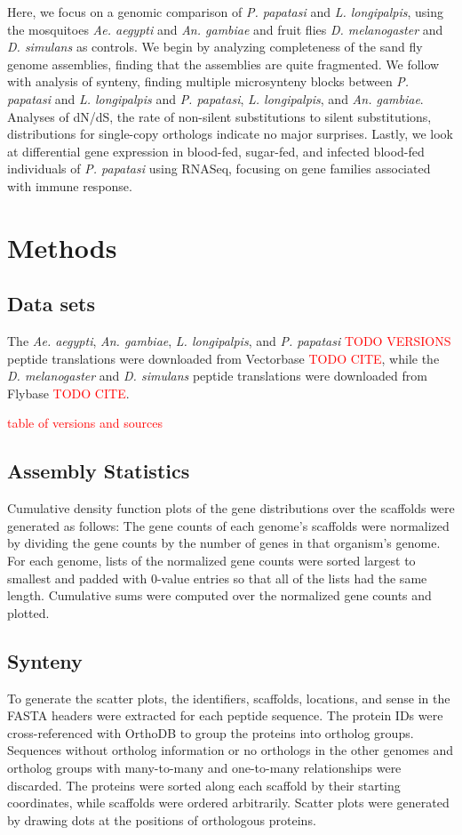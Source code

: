 Here, we focus on a genomic comparison of \emph{P. papatasi} and \emph{L. longipalpis}, using the mosquitoes \emph{Ae. aegypti} and \emph{An. gambiae} and fruit flies \emph{D. melanogaster} and \emph{D. simulans} as controls.  We begin by analyzing completeness of the sand fly genome assemblies, finding that the assemblies are quite fragmented.  We follow with analysis of synteny, finding multiple microsynteny blocks between \emph{P. papatasi} and \emph{L. longipalpis} and \emph{P. papatasi}, \emph{L. longipalpis}, and \emph{An. gambiae}. Analyses of dN/dS, the rate of non-silent substitutions to silent substitutions, distributions for single-copy orthologs indicate no major surprises.  Lastly, we look at differential gene expression in blood-fed, sugar-fed, and infected blood-fed individuals of \emph{P. papatasi} using RNASeq, focusing on gene families associated with immune response.

\section{Methods}

\subsection{Data sets}
The \emph{Ae. aegypti}, \emph{An. gambiae}, \emph{L. longipalpis}, and \emph{P. papatasi} \textcolor{red}{TODO VERSIONS} peptide translations were downloaded from Vectorbase \textcolor{red}{TODO CITE}, while the \emph{D. melanogaster} and \emph{D. simulans} peptide translations were downloaded from Flybase \textcolor{red}{TODO CITE}.

\textcolor{red}{table of versions and sources}

\subsection{Assembly Statistics}
Cumulative density function plots of the gene distributions over the scaffolds were generated as follows: The gene counts of each genome's scaffolds were normalized by dividing the gene counts by the number of genes in that organism's genome. For each genome, lists of the normalized gene counts were sorted largest to smallest and padded with 0-value entries so that all of the lists had the same length.  Cumulative sums were computed over the normalized gene counts and plotted.


\subsection{Synteny}
To generate the scatter plots, the identifiers, scaffolds, locations, and sense in the FASTA headers were extracted for each peptide sequence.  The protein IDs were cross-referenced with OrthoDB to group the proteins into ortholog groups.  Sequences without ortholog information or no orthologs in the other genomes and ortholog groups with many-to-many and one-to-many relationships were discarded.  The proteins were sorted along each scaffold by their starting coordinates, while scaffolds were ordered arbitrarily.  Scatter plots were generated by drawing dots at the positions of orthologous proteins.

